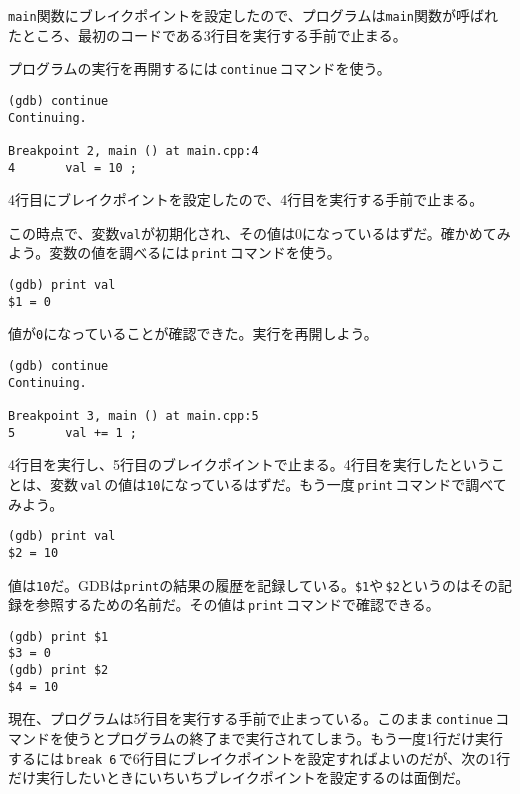 \texttt{main}関数にブレイクポイントを設定したので、プログラムは\texttt{main}関数が呼ばれたところ、最初のコードである3行目を実行する手前で止まる。

プログラムの実行を再開するには\,\texttt{continue}\,コマンドを使う。

\begin{lstlisting}[style=terminal]
(gdb) continue
Continuing.

Breakpoint 2, main () at main.cpp:4
4       val = 10 ;
\end{lstlisting}

4行目にブレイクポイントを設定したので、4行目を実行する手前で止まる。

この時点で、変数\texttt{val}が初期化され、その値は0になっているはずだ。確かめてみよう。変数の値を調べるには\,\texttt{print}\,コマンドを使う。

\begin{lstlisting}[style=terminal]
(gdb) print val
$1 = 0
\end{lstlisting}

値が\texttt{0}になっていることが確認できた。実行を再開しよう。

\ifTombow\pagebreak\fi
\begin{lstlisting}[style=terminal]
(gdb) continue
Continuing.

Breakpoint 3, main () at main.cpp:5
5       val += 1 ;
\end{lstlisting}

4行目を実行し、5行目のブレイクポイントで止まる。4行目を実行したということは、変数\,\texttt{val}\,の値は\texttt{10}になっているはずだ。もう一度\,\texttt{print}\,コマンドで調べてみよう。

\begin{lstlisting}[style=terminal]
(gdb) print val
$2 = 10
\end{lstlisting}

値は\texttt{10}だ。GDBは\texttt{print}の結果の履歴を記録している。\texttt{\$1}や\,\texttt{\$2}というのはその記録を参照するための名前だ。その値は\,\texttt{print}\,コマンドで確認できる。

\begin{lstlisting}[style=terminal]
(gdb) print $1
$3 = 0
(gdb) print $2
$4 = 10
\end{lstlisting}

現在、プログラムは5行目を実行する手前で止まっている。このまま\,\texttt{continue}\,コマンドを使うとプログラムの終了まで実行されてしまう。もう一度1行だけ実行するには\,\texttt{break 6}\,で6行目にブレイクポイントを設定すればよいのだが、次の1行だけ実行したいときにいちいちブレイクポイントを設定するのは面倒だ。


